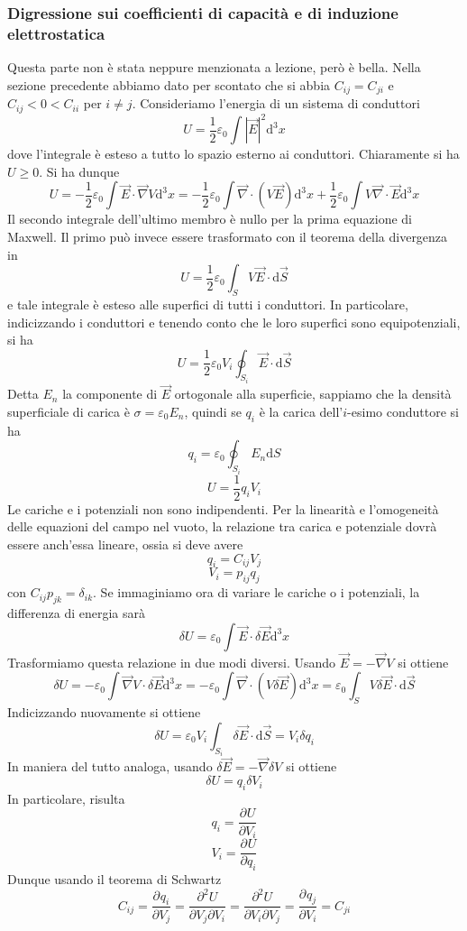 \documentclass[a4paper,11pt]{book}
\let\oldnabla\nabla
\renewcommand{\nabla}{\vec{\oldnabla}}
\newcommand{\der}[3][]{\frac{\partial ^{#1}#2}{\partial #3^{#1}}}
\newcommand{\dif}{\mathrm{d}}
\let\oldepsilon\epsilon
\let\oldvarepsilon\varepsilon
\renewcommand{\epsilon}{\oldvarepsilon}
\renewcommand{\varepsilon}{\oldepsilon}
\theoremstyle{definition}
\theoremstyle{theorem}
\begin{document}
	\subsubsection{Digressione sui coefficienti di capacità e di induzione elettrostatica}
	Questa parte non è stata neppure menzionata a lezione, però è bella. Nella sezione precedente abbiamo dato per scontato che si abbia $C_{ij}=C_{ji}$ e $C_{ij}<0<C_{ii}$ per $i\neq j$. Consideriamo l'energia di un sistema di conduttori
	\[U=\frac{1}{2}\epsilon_0\int|\vec{E}|^2\dif^3x\]
	dove l'integrale è esteso a tutto lo spazio esterno ai conduttori. Chiaramente si ha $U\geq0$. Si ha dunque
	\[U=-\frac{1}{2}\epsilon_0\int\vec{E}\cdot\nabla V\dif^3x=-\frac{1}{2}\epsilon_0\int\nabla\cdot\left(V\vec{E}\right)\dif^3x+\frac{1}{2}\epsilon_0\int V\nabla\cdot\vec{E}\dif^3x\]
	Il secondo integrale dell'ultimo membro è nullo per la prima equazione di Maxwell. Il primo può invece essere trasformato con il teorema della divergenza in
	\[U=\frac{1}{2}\epsilon_0\int_SV\vec{E}\cdot\dif\vec{S}\]
	e tale integrale è esteso alle superfici di tutti i conduttori. In particolare, indicizzando i conduttori e tenendo conto che le loro superfici sono equipotenziali, si ha
	\[U=\frac{1}{2}\epsilon_0V_i\oint_{S_i}\vec{E}\cdot\dif\vec{S}\]
	Detta $E_n$ la componente di $\vec{E}$ ortogonale alla superficie, sappiamo che la densità superficiale di carica è $\sigma=\epsilon_0E_n$, quindi se $q_i$ è la carica dell'$i$-esimo conduttore si ha
	\[q_i=\epsilon_0\oint_{S_i}E_n\dif S\]
	\[U=\frac{1}{2}q_iV_i\]
	Le cariche e i potenziali non sono indipendenti. Per la linearità e l'omogeneità delle equazioni del campo nel vuoto, la relazione tra carica e potenziale dovrà essere anch'essa lineare, ossia si deve avere
	\[q_i=C_{ij}V_j\]
	\[V_i=p_{ij}q_j\]
	con $C_{ij}p_{jk}=\delta_{ik}$. Se immaginiamo ora di variare le cariche o i potenziali, la differenza di energia sarà
	\[\delta U=\epsilon_0\int\vec{E}\cdot\delta\vec{E}\dif^3x\]
	Trasformiamo questa relazione in due modi diversi. Usando $\vec{E}=-\nabla V$ si ottiene
	\[\delta U=-\epsilon_0\int\nabla V\cdot\delta\vec{E}\dif^3x=-\epsilon_0\int\nabla\cdot\left(V\delta\vec{E}\right)\dif^3x=\epsilon_0\int_SV\delta\vec{E}\cdot\dif\vec{S}\]
	Indicizzando nuovamente si ottiene
	\[\delta U=\epsilon_0V_i\int_{S_i}\delta\vec{E}\cdot\dif\vec{S}=V_i\delta q_i\]
	In maniera del tutto analoga, usando $\delta\vec{E}=-\nabla\delta V$ si ottiene
	\[\delta U=q_i\delta V_i\]
	In particolare, risulta
	\[q_i=\der{U}{V_i}\]
	\[V_i=\der{U}{q_i}\]
	Dunque usando il teorema di Schwartz
	\[C_{ij}=\der{q_i}{V_j}=\frac{\partial^2U}{\partial V_j\partial V_i}=\frac{\partial^2U}{\partial V_i\partial V_j}=\der{q_j}{V_i}=C_{ji}\]
\end{document}
